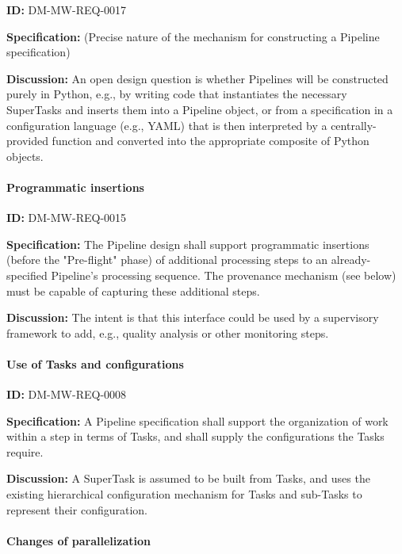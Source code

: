 \documentclass[SE,toc,lsstdraft]{lsstdoc}
\begin{document}
\label{DM-MW-REQ-0017}
\textbf{ID:} DM-MW-REQ-0017

\textbf{Specification:}
(Precise nature of the mechanism for constructing a Pipeline specification)

\textbf{Discussion:}
An open design question is whether Pipelines will be constructed purely in Python, e.g., by writing code that instantiates the necessary SuperTasks and inserts them into a Pipeline object, or from a specification in a configuration language (e.g., YAML) that is then interpreted by a centrally-provided function and converted into the appropriate composite of Python objects.




\paragraph{Programmatic insertions}\hfill  %

\label{DM-MW-REQ-0015}
\textbf{ID:} DM-MW-REQ-0015

\textbf{Specification:}
The Pipeline design shall support programmatic insertions (before the "Pre-flight" phase) of additional processing steps to an already-specified Pipeline’s processing sequence. The provenance mechanism (see below) must be capable of capturing these additional steps.

\textbf{Discussion:}
The intent is that this interface could be used by a supervisory framework to add, e.g., quality analysis or other monitoring steps.




\paragraph{Use of Tasks and configurations}\hfill  %

\label{DM-MW-REQ-0008}
\textbf{ID:} DM-MW-REQ-0008

\textbf{Specification:}
A Pipeline specification shall support the organization of work within a step in terms of Tasks, and shall supply the configurations the Tasks require.

\textbf{Discussion:}
A SuperTask is assumed to be built from Tasks, and uses the existing hierarchical configuration mechanism for Tasks and sub-Tasks to represent their configuration.




\paragraph{Changes of parallelization}\hfill  %
\end{document}
